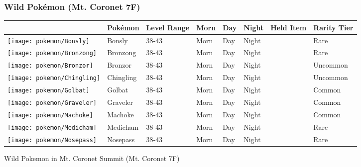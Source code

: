 \subsubsection{Wild Pokémon (Mt. Coronet 7F)}%
\label{ssubsec:WildPokmon(Mt.Coronet7F)}%
\begin{longtable}{||l l l l l l l l||}%
\hline%
\rowcolor{gray}%
&Pokémon&Level Range&Morn&Day&Night&Held Item&Rarity Tier\\%
\hline%
\endhead%
\hline%
\rowcolor{gray}%
\texttt{[image: pokemon/Bonsly]}&Bonsly&38{-}43&Morn&Day&Night&&\textcolor{RedOrange}{%
Rare%
}\\%
\hline%
\rowcolor{gray}%
\texttt{[image: pokemon/Bronzong]}&Bronzong&38{-}43&Morn&Day&Night&&\textcolor{RedOrange}{%
Rare%
}\\%
\hline%
\rowcolor{gray}%
\texttt{[image: pokemon/Bronzor]}&Bronzor&38{-}43&Morn&Day&Night&&\textcolor{OliveGreen}{%
Uncommon%
}\\%
\hline%
\rowcolor{gray}%
\texttt{[image: pokemon/Chingling]}&Chingling&38{-}43&Morn&Day&Night&&\textcolor{OliveGreen}{%
Uncommon%
}\\%
\hline%
\rowcolor{gray}%
\texttt{[image: pokemon/Golbat]}&Golbat&38{-}43&Morn&Day&Night&&\textcolor{black}{%
Common%
}\\%
\hline%
\rowcolor{gray}%
\texttt{[image: pokemon/Graveler]}&Graveler&38{-}43&Morn&Day&Night&&\textcolor{black}{%
Common%
}\\%
\hline%
\rowcolor{gray}%
\texttt{[image: pokemon/Machoke]}&Machoke&38{-}43&Morn&Day&Night&&\textcolor{black}{%
Common%
}\\%
\hline%
\rowcolor{gray}%
\texttt{[image: pokemon/Medicham]}&Medicham&38{-}43&Morn&Day&Night&&\textcolor{RedOrange}{%
Rare%
}\\%
\hline%
\rowcolor{gray}%
\texttt{[image: pokemon/Nosepass]}&Nosepass&38{-}43&Morn&Day&Night&&\textcolor{RedOrange}{%
Rare%
}\\%
\hline%
\end{longtable}%
\caption{Wild Pokemon in Mt. Coronet Summit (Mt. Coronet 7F)}